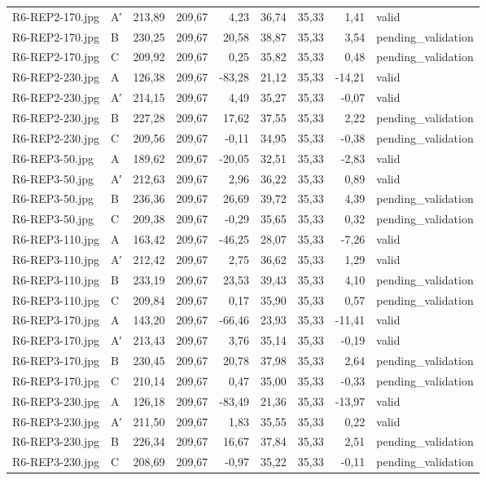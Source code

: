 \begin{scriptsize}
\begin{longtable}{@{}llrrrrrrl@{}}
R6-REP2-170.jpg & A′ & 213,89 & 209,67 & 4,23 & 36,74 & 35,33 & 1,41 & valid \\
R6-REP2-170.jpg & B & 230,25 & 209,67 & 20,58 & 38,87 & 35,33 & 3,54 & pending\_validation \\
R6-REP2-170.jpg & C & 209,92 & 209,67 & 0,25 & 35,82 & 35,33 & 0,48 & pending\_validation \\
R6-REP2-230.jpg & A & 126,38 & 209,67 & -83,28 & 21,12 & 35,33 & -14,21 & valid \\
R6-REP2-230.jpg & A′ & 214,15 & 209,67 & 4,49 & 35,27 & 35,33 & -0,07 & valid \\
R6-REP2-230.jpg & B & 227,28 & 209,67 & 17,62 & 37,55 & 35,33 & 2,22 & pending\_validation \\
R6-REP2-230.jpg & C & 209,56 & 209,67 & -0,11 & 34,95 & 35,33 & -0,38 & pending\_validation \\
R6-REP3-50.jpg & A & 189,62 & 209,67 & -20,05 & 32,51 & 35,33 & -2,83 & valid \\
R6-REP3-50.jpg & A′ & 212,63 & 209,67 & 2,96 & 36,22 & 35,33 & 0,89 & valid \\
R6-REP3-50.jpg & B & 236,36 & 209,67 & 26,69 & 39,72 & 35,33 & 4,39 & pending\_validation \\
R6-REP3-50.jpg & C & 209,38 & 209,67 & -0,29 & 35,65 & 35,33 & 0,32 & pending\_validation \\
R6-REP3-110.jpg & A & 163,42 & 209,67 & -46,25 & 28,07 & 35,33 & -7,26 & valid \\
R6-REP3-110.jpg & A′ & 212,42 & 209,67 & 2,75 & 36,62 & 35,33 & 1,29 & valid \\
R6-REP3-110.jpg & B & 233,19 & 209,67 & 23,53 & 39,43 & 35,33 & 4,10 & pending\_validation \\
R6-REP3-110.jpg & C & 209,84 & 209,67 & 0,17 & 35,90 & 35,33 & 0,57 & pending\_validation \\
R6-REP3-170.jpg & A & 143,20 & 209,67 & -66,46 & 23,93 & 35,33 & -11,41 & valid \\
R6-REP3-170.jpg & A′ & 213,43 & 209,67 & 3,76 & 35,14 & 35,33 & -0,19 & valid \\
R6-REP3-170.jpg & B & 230,45 & 209,67 & 20,78 & 37,98 & 35,33 & 2,64 & pending\_validation \\
R6-REP3-170.jpg & C & 210,14 & 209,67 & 0,47 & 35,00 & 35,33 & -0,33 & pending\_validation \\
R6-REP3-230.jpg & A & 126,18 & 209,67 & -83,49 & 21,36 & 35,33 & -13,97 & valid \\
R6-REP3-230.jpg & A′ & 211,50 & 209,67 & 1,83 & 35,55 & 35,33 & 0,22 & valid \\
R6-REP3-230.jpg & B & 226,34 & 209,67 & 16,67 & 37,84 & 35,33 & 2,51 & pending\_validation \\
R6-REP3-230.jpg & C & 208,69 & 209,67 & -0,97 & 35,22 & 35,33 & -0,11 & pending\_validation \\
\end{longtable}
\end{scriptsize}
